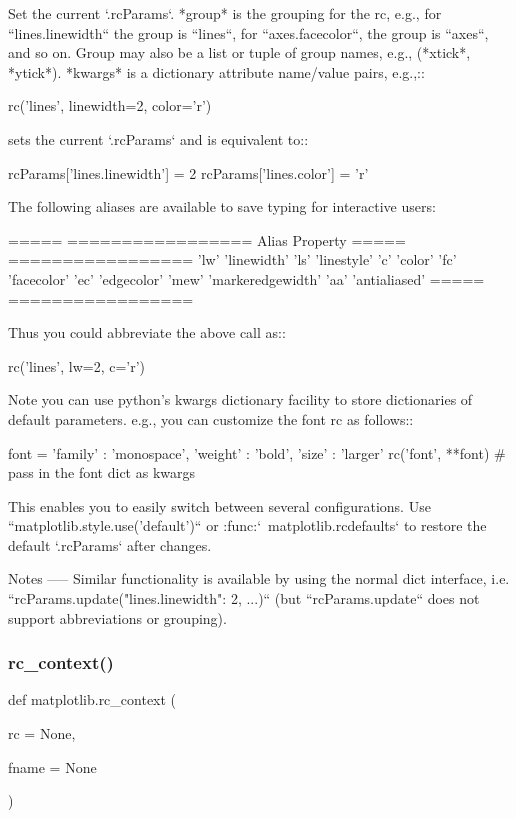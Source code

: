 \begin{DoxyVerb}Set the current `.rcParams`.  *group* is the grouping for the rc, e.g.,
for ``lines.linewidth`` the group is ``lines``, for
``axes.facecolor``, the group is ``axes``, and so on.  Group may
also be a list or tuple of group names, e.g., (*xtick*, *ytick*).
*kwargs* is a dictionary attribute name/value pairs, e.g.,::

  rc('lines', linewidth=2, color='r')

sets the current `.rcParams` and is equivalent to::

  rcParams['lines.linewidth'] = 2
  rcParams['lines.color'] = 'r'

The following aliases are available to save typing for interactive users:

=====   =================
Alias   Property
=====   =================
'lw'    'linewidth'
'ls'    'linestyle'
'c'     'color'
'fc'    'facecolor'
'ec'    'edgecolor'
'mew'   'markeredgewidth'
'aa'    'antialiased'
=====   =================

Thus you could abbreviate the above call as::

      rc('lines', lw=2, c='r')

Note you can use python's kwargs dictionary facility to store
dictionaries of default parameters.  e.g., you can customize the
font rc as follows::

  font = {'family' : 'monospace',
          'weight' : 'bold',
          'size'   : 'larger'}
  rc('font', **font)  # pass in the font dict as kwargs

This enables you to easily switch between several configurations.  Use
``matplotlib.style.use('default')`` or :func:`~matplotlib.rcdefaults` to
restore the default `.rcParams` after changes.

Notes
-----
Similar functionality is available by using the normal dict interface, i.e.
``rcParams.update({"lines.linewidth": 2, ...})`` (but ``rcParams.update``
does not support abbreviations or grouping).
\end{DoxyVerb}
 \mbox{\label{namespacematplotlib_a72f32e32fe5a555b733ea38fc472335e}} 
\subsubsection{\texorpdfstring{rc\+\_\+context()}{rc\_context()}}
{\footnotesize\ttfamily def matplotlib.\+rc\+\_\+context (\begin{DoxyParamCaption}\item[{}]{rc = {\ttfamily None},  }\item[{}]{fname = {\ttfamily None} }\end{DoxyParamCaption})}

